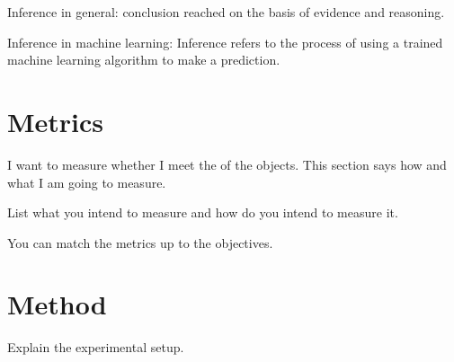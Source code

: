 Inference in general: conclusion reached on the basis of evidence and reasoning.

Inference in machine learning: Inference refers to the process of using a trained machine learning algorithm to make a prediction.

\section{Metrics}

I want to measure whether I meet the of the objects.
This section says how and what I am going to measure.

List what you intend to measure and how do you intend to measure it.

You can match the metrics up to the objectives.

\section{Method}

Explain the experimental setup.